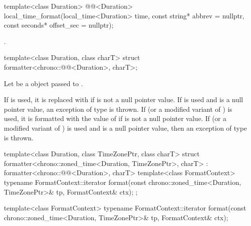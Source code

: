 %
\begin{itemdecl}
template<class Duration>
  @@<Duration>
    local_time_format(local_time<Duration> time, const string* abbrev = nullptr,
                      const seconds* offset_sec = nullptr);
\end{itemdecl}

\begin{itemdescr}
\pnum
\returns
{}.
\end{itemdescr}

%
\begin{itemdecl}
template<class Duration, class charT>
  struct formatter<chrono::@@<Duration>, charT>;
\end{itemdecl}

\begin{itemdescr}
\pnum
Let  be a  object
passed to .

\pnum
\remarks
If  is used,
it is replaced with 
if  is not a null pointer value.
If  is used
and  is a null pointer value,
an exception of type  is thrown.
If  (or a modified variant of ) is used,
it is formatted with the value of 
if  is not a null pointer value.
If  (or a modified variant of ) is used
and  is a null pointer value,
then an exception of type  is thrown.
\end{itemdescr}

%
\begin{codeblock}
template<class Duration, class TimeZonePtr, class charT>
struct formatter<chrono::zoned_time<Duration, TimeZonePtr>, charT>
    : formatter<chrono::@@<Duration>, charT> {
  template<class FormatContext>
    typename FormatContext::iterator
      format(const chrono::zoned_time<Duration, TimeZonePtr>& tp, FormatContext& ctx);
};
\end{codeblock}

%
\begin{itemdecl}
template<class FormatContext>
  typename FormatContext::iterator
    format(const chrono::zoned_time<Duration, TimeZonePtr>& tp, FormatContext& ctx);
\end{itemdecl}

